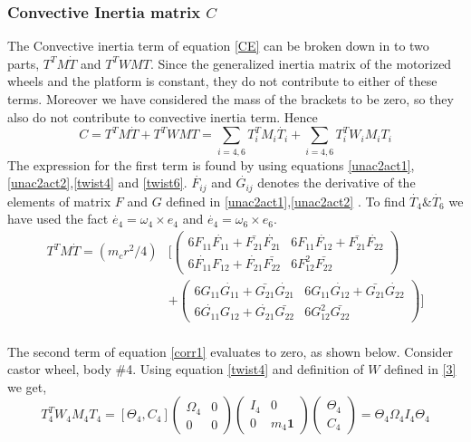 \subsubsection*{Convective Inertia matrix $C$}
The Convective inertia term of equation \ref{CE} can be broken down in to two parts, $T^TM\dot{T}$ and $T^TWMT$. Since the generalized inertia matrix of the motorized wheels and the platform is constant, they do not contribute to either of these terms. Moreover we have considered the mass of the brackets to be zero, so they also do not contribute to convective inertia term. Hence
\begin{equation}
\label{Convective}
C=T^TM\dot{T}+T^TWMT=\sum_{i=4,6}T^T_iM_i\dot{T_i}+\sum_{i=4,6}T_i^TW_iM_iT_i
\end{equation}
The expression for the first term is found by using equations \ref{unac2act1},\ref{unac2act2},\ref{twist4} and \ref{twist6}. $\dot{F_{ij}}$ and $\dot{G_{ij}}$ denotes the derivative of the elements of matrix $F$ and $G$ defined in \ref{unac2act1},\ref{unac2act2} . To find $\dot{T_4} \& \dot{T_6}$ we have used the fact $\dot{e_4}=\omega_4 \times e_4 $ and $\dot{e_4}=\omega_6 \times e_6 $. 
\begin{equation}
\label{corr1}
\begin{split}
T^TM\dot{T}=
(m_cr^2/4)& \biggl[ \begin{pmatrix}
6F_{11}\dot{F_{11}}+\bar{F_{21}}\dot{F_{21}} & 6F_{11}\dot{F_{12}}+\bar{F_{21}}\dot{F_{22}}\\
6\dot{F_{11}}F_{12}+\dot{F_{21}}\bar{F_{22}} & 6F_{12}^2\bar{F_{22}}
\end{pmatrix}\\
&+\begin{pmatrix}
6G_{11}\dot{G_{11}}+\bar{G_{21}}\dot{G_{21}} & 6G_{11}\dot{G_{12}}+\bar{G_{21}}\dot{G_{22}}\\
6\dot{G_{11}}G_{12}+\dot{G_{21}}\bar{G_{22}} & 6G_{12}^2\bar{G_{22}}
\end{pmatrix} \biggr]
\end{split}
\end{equation}
\\
The second term of equation \ref{corr1} evaluates to zero, as shown below. Consider castor wheel, body \#4. Using equation \ref{twist4} and definition of $W$ defined in  \ref{3} we get,
\begin{equation}
\label{corr2}
T^T_4W_4M_4T_4=[\Theta_4, C_4]\begin{pmatrix}
\Omega_4 &0\\0&0
\end{pmatrix}
\begin{pmatrix}
I_4&0\\0 &m_4 \mathbf{1}
\end{pmatrix}
\begin{pmatrix}
\Theta_4\\C_4
\end{pmatrix}=\Theta_4\Omega_4I_4\Theta_4
\end{equation}

